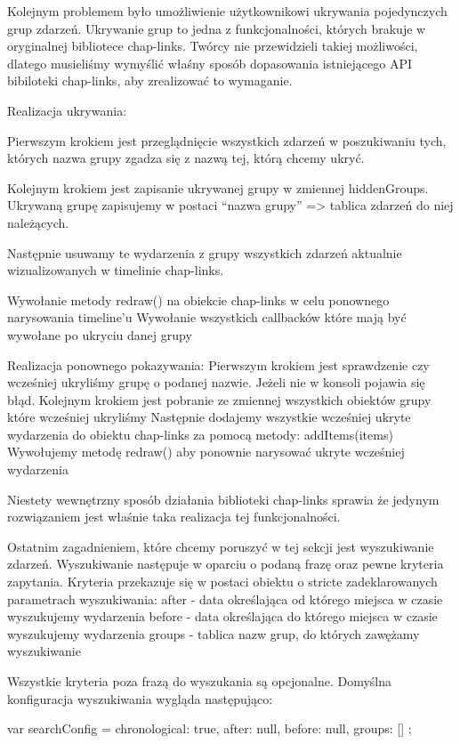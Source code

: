 \documentclass[polish,12pt]{aghthesis}
\begin{document}
{Kolejnym problemem było umożliwienie użytkownikowi ukrywania pojedynczych grup zdarzeń. 
Ukrywanie grup to jedna z funkcjonalności, których brakuje w oryginalnej bibliotece chap-links. Twórcy nie przewidzieli takiej możliwości, dlatego musieliśmy wymyślić właśny sposób dopasowania istniejącego API bibiloteki chap-links, aby zrealizować to wymaganie.

Realizacja ukrywania:

Pierwszym krokiem jest przeglądnięcie wszystkich zdarzeń w poszukiwaniu tych, których nazwa grupy zgadza się z nazwą tej, którą chcemy ukryć. 

Kolejnym krokiem jest zapisanie ukrywanej grupy w zmiennej hiddenGroups.
Ukrywaną grupę zapisujemy w postaci “nazwa grupy” => tablica zdarzeń do niej należących.

Następnie usuwamy te wydarzenia z grupy wszystkich zdarzeń aktualnie wizualizowanych w timelinie chap-links.

Wywołanie metody redraw() na obiekcie chap-links w celu ponownego narysowania timeline’u
Wywołanie wszystkich callbacków które mają być wywołane po ukryciu danej grupy


Realizacja ponownego pokazywania:
Pierwszym krokiem jest sprawdzenie czy wcześniej ukryliśmy grupę o podanej nazwie. Jeżeli nie w konsoli pojawia się błąd.
Kolejnym krokiem jest pobranie ze zmiennej wszystkich obiektów grupy które wcześniej ukryliśmy
Następnie dodajemy wszystkie wcześniej ukryte wydarzenia do obiektu chap-links za pomocą metody: addItems(items)
Wywołujemy metodę redraw() aby ponownie narysować ukryte wcześniej wydarzenia 

Niestety wewnętrzny sposób działania biblioteki chap-links sprawia że jedynym rozwiązaniem jest właśnie taka realizacja tej funkcjonalności.



Ostatnim zagadnieniem, które chcemy poruszyć w tej sekcji jest wyszukiwanie zdarzeń. 
Wyszukiwanie następuje w oparciu o podaną frazę oraz pewne kryteria zapytania.
Kryteria przekazuje się w postaci obiektu o stricte zadeklarowanych parametrach wyszukiwania:
after - data określająca od którego miejsca w czasie wyszukujemy wydarzenia
before - data określająca do którego miejsca w czasie wyszukujemy wydarzenia
groups - tablica nazw grup, do których zawężamy wyszukiwanie

Wszystkie kryteria poza frazą do wyszukania są opcjonalne. Domyślna konfiguracja wyszukiwania wygląda następująco:

 var searchConfig = {
                chronological: true,
                after: null,
                before: null,
                groups: []
            };

}
\end{document}

